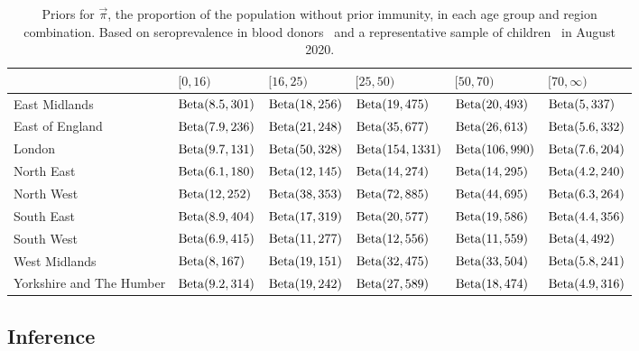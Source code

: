 \documentclass[thesis.tex]{subfiles}
\begin{document}
\begin{landscape}
\begin{table}
\centering
\begin{tabular}{l|lllll}
         & $[0,16)$ & $[16,25)$ & $[25,50)$ & $[50,70)$ & $[70,\infty)$ \\
        \hline
        East Midlands & $\operatorname{Beta}(8.5, 301)$ & $\operatorname{Beta}(18, 256)$ & $\operatorname{Beta}(19, 475)$ & $\operatorname{Beta}(20, 493)$ & $\operatorname{Beta}(5, 337)$ \\
        East of England & $\operatorname{Beta}(7.9, 236)$ & $\operatorname{Beta}(21, 248)$ & $\operatorname{Beta}(35, 677)$ & $\operatorname{Beta}(26, 613)$ & $\operatorname{Beta}(5.6, 332)$ \\
        London & $\operatorname{Beta}(9.7, 131)$ & $\operatorname{Beta}(50, 328)$ & $\operatorname{Beta}(154, 1331)$ & $\operatorname{Beta}(106, 990)$ & $\operatorname{Beta}(7.6, 204)$ \\
        North East & $\operatorname{Beta}(6.1, 180)$ & $\operatorname{Beta}(12, 145)$ & $\operatorname{Beta}(14, 274)$ & $\operatorname{Beta}(14, 295)$ & $\operatorname{Beta}(4.2, 240)$ \\
        North West & $\operatorname{Beta}(12, 252)$ & $\operatorname{Beta}(38, 353)$ & $\operatorname{Beta}(72, 885)$ & $\operatorname{Beta}(44, 695)$ & $\operatorname{Beta}(6.3, 264)$ \\
        South East & $\operatorname{Beta}(8.9, 404)$ & $\operatorname{Beta}(17, 319)$ & $\operatorname{Beta}(20, 577)$ & $\operatorname{Beta}(19, 586)$ & $\operatorname{Beta}(4.4, 356)$ \\
        South West & $\operatorname{Beta}(6.9, 415)$ & $\operatorname{Beta}(11, 277)$ & $\operatorname{Beta}(12, 556)$ & $\operatorname{Beta}(11, 559)$ & $\operatorname{Beta}(4, 492)$ \\
        West Midlands & $\operatorname{Beta}(8, 167)$ & $\operatorname{Beta}(19, 151)$ & $\operatorname{Beta}(32, 475)$ & $\operatorname{Beta}(33, 504)$ & $\operatorname{Beta}(5.8, 241)$ \\
        Yorkshire and The Humber & $\operatorname{Beta}(9.2, 314)$ & $\operatorname{Beta}(19, 242)$ & $\operatorname{Beta}(27, 589)$ & $\operatorname{Beta}(18, 474)$ & $\operatorname{Beta}(4.9, 316)$ \\
    \end{tabular}
\caption{Priors for $\vec{\pi}$, the proportion of the population without prior immunity, in each age group and region combination. Based on seroprevalence in blood donors~\autocite{amirthalingamSeroprevalence} and a representative sample of children~\autocite{ratcliffeCommunity} in August 2020.}
\label{SEIR:table:immunity-prior}
\end{table}
\end{landscape}

\subsection{Inference} \label{SEIR:sec:MCMC}
\end{document}
